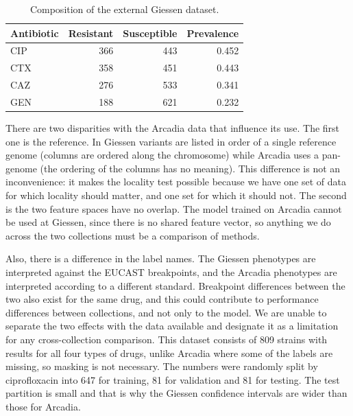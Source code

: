\documentclass[journal]{IEEEtran}
\begin{document}
\begin{table}[!tb]
\caption{Composition of the external Giessen dataset.}
\label{tab:giessen}
\centering
\small
\setlength{\tabcolsep}{4pt}
\renewcommand{\arraystretch}{1.05}
\begin{tabular}{|l|r|r|r|}
\hline
\rowcolor{headgrey}
\textbf{Antibiotic} & \textbf{Resistant} & \textbf{Susceptible} & \textbf{Prevalence} \\ \hline
CIP & 366 & 443 & 0.452 \\ \hline
CTX & 358 & 451 & 0.443 \\ \hline
CAZ & 276 & 533 & 0.341 \\ \hline
GEN & 188 & 621 & 0.232 \\ \hline
\end{tabular}
\renewcommand{\arraystretch}{1.0}
\end{table}

There are two disparities with the Arcadia data that influence its use. The first
one is the reference. In Giessen variants are listed in order of a single reference
genome (columns are ordered along the chromosome) while Arcadia uses a pan-genome
(the ordering of the columns has no meaning). This difference is not an
inconvenience: it makes the locality test possible because we have one set of data
for which locality should matter, and one set for which it should not. The second is
the two feature spaces have no overlap. The model trained on Arcadia cannot be used
at Giessen, since there is no shared feature vector, so anything we do across the two
collections must be a comparison of methods.

Also, there is a difference in the label names. The Giessen phenotypes are
interpreted against the EUCAST breakpoints, and the Arcadia phenotypes are
interpreted according to a different standard. Breakpoint differences between the two
also exist for the same drug, and this could contribute to performance differences
between collections, and not only to the model. We are unable to separate the two
effects with the data available and designate it as a limitation for any
cross-collection comparison. This dataset consists of 809 strains with results for
all four types of drugs, unlike Arcadia where some of the labels are missing, so
masking is not necessary. The numbers were randomly split by ciprofloxacin into 647
for training, 81 for validation and 81 for testing. The test partition is small and
that is why the Giessen confidence intervals are wider than those for Arcadia.

\end{document}
